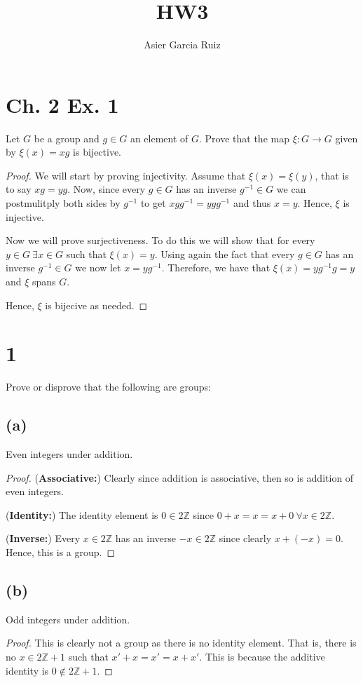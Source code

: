 \documentclass{article}
\title{HW3}
\author{Asier Garcia Ruiz}
\newcommand{\Z}{\mathbb{Z}}
\begin{document}
\maketitle

\section*{Ch. 2 Ex. 1}
Let $G$ be a group and $g \in G$ an element of $G$. Prove that the map $\xi: G\to G$ given by $\xi(x) = xg$ is bijective.

\begin{proof}
    We will start by proving injectivity. Assume that $\xi(x) = \xi(y)$, that is to say
    $xg = yg$. Now, since every $g\in G$ has an inverse $g^{-1} \in G$ we can postmulitply
    both sides by $g^{-1}$ to get $xgg^{-1} = ygg^{-1}$ and thus $x=y$. Hence, $\xi$ is
    injective.

    Now we will prove surjectiveness. To do this we will show that for every
    $y \in G \ \exists x \in G$ such that $\xi(x) = y$. Using again the fact that every
    $g \in G$ has an inverse $g^{-1} \in G$ we now let $x = yg^{-1}$. Therefore, we have that
    $\xi(x) = yg^{-1}g = y$ and $\xi$ spans $G$.

    Hence, $\xi$ is bijecive as needed.
\end{proof}

\section*{1}
Prove or disprove that the following are groups:
\subsection*{(a)}
Even integers under addition.
\begin{proof}
    (\textbf{Associative:}) Clearly since addition is associative, then so is addition of even
    integers.

    (\textbf{Identity:}) The identity element is $0\in 2\Z$ since
    $0+ x = x = x + 0 \ \forall x \in 2\Z$.

    (\textbf{Inverse:}) Every $x \in 2\Z$ has an inverse $-x \in 2\Z$ since clearly $x + (-x) = 0$.
    Hence, this is a group.
\end{proof}

\subsection*{(b)}
Odd integers under addition.
\begin{proof}
    This is clearly not a group as there is no identity element. That is, there is no
    $x \in 2\Z + 1$ such that $x' + x = x' = x + x'$. This is because the additive
    identity is $0 \notin 2\Z + 1$.
\end{proof}
\end{document}
